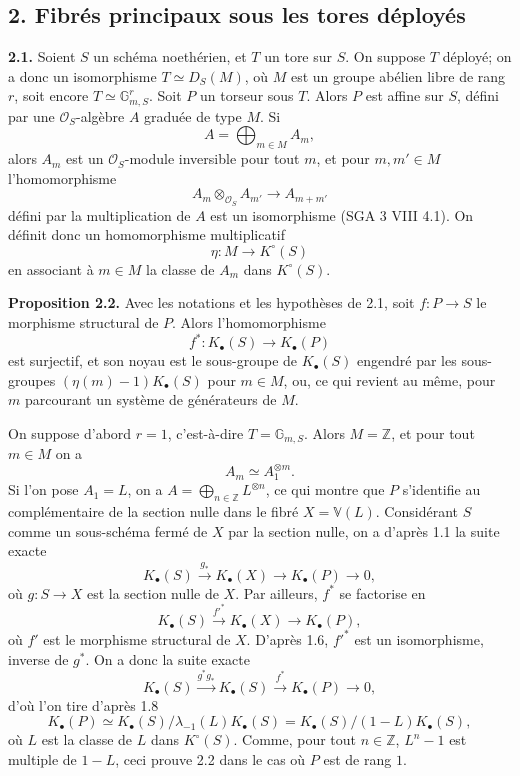 \documentclass[11pt]{article}
\begin{document}
\subsection*{2. Fibrés principaux sous les tores déployés}

\textbf{2.1.} Soient $S$ un schéma noethérien, et $T$ un tore sur $S$. On suppose $T$ déployé; on a donc un isomorphisme $T\simeq D_S(M)$, où $M$ est un groupe abélien libre de rang $r$, soit encore $T\simeq \mathbb G_{m,S}^r$. Soit $P$ un torseur sous $T$. Alors $P$ est affine sur $S$, défini par une $\mathcal O_S$-algèbre $A$ graduée de type $M$. Si
\[
A=\bigoplus_{m\in M}A_m,
\]
alors $A_m$ est un $\mathcal O_S$-module inversible pour tout $m$, et pour $m,m'\in M$ l'homomorphisme
\[
A_m\otimes_{\mathcal O_S}A_{m'}\longrightarrow A_{m+m'}
\]
défini par la multiplication de $A$ est un isomorphisme (SGA 3 VIII 4.1). On définit donc un homomorphisme multiplicatif
\[
\eta:M\longrightarrow K^\circ(S)
\]
en associant à $m\in M$ la classe de $A_m$ dans $K^\circ(S)$.

\textbf{Proposition 2.2.} Avec les notations et les hypothèses de 2.1, soit $f:P\to S$ le morphisme structural de $P$. Alors l'homomorphisme
\[
f^*:K_\bullet(S)\longrightarrow K_\bullet(P)
\]
est surjectif, et son noyau est le sous-groupe de $K_\bullet(S)$ engendré par les sous-groupes $(\eta(m)-1)K_\bullet(S)$ pour $m\in M$, ou, ce qui revient au même, pour $m$ parcourant un système de générateurs de $M$.

On suppose d'abord $r=1$, c'est-à-dire $T=\mathbb G_{m,S}$. Alors $M=\mathbb Z$, et pour tout $m\in M$ on a
\[
A_m\simeq A_1^{\otimes m}.
\]
Si l'on pose $A_1=L$, on a $A=\bigoplus_{n\in\mathbb Z}L^{\otimes n}$, ce qui montre que $P$ s'identifie au complémentaire de la section nulle dans le fibré $X=\mathbb V(L)$. Considérant $S$ comme un sous-schéma fermé de $X$ par la section nulle, on a d'après 1.1 la suite exacte
\[
K_\bullet(S)\xrightarrow{g_*}K_\bullet(X)\longrightarrow K_\bullet(P)\longrightarrow 0,
\]
où $g:S\to X$ est la section nulle de $X$. Par ailleurs, $f^*$ se factorise en
\[
K_\bullet(S)\xrightarrow{f'^*}K_\bullet(X)\longrightarrow K_\bullet(P),
\]
où $f'$ est le morphisme structural de $X$. D'après 1.6, $f'^*$ est un isomorphisme, inverse de $g^*$. On a donc la suite exacte
\[
K_\bullet(S)\xrightarrow{g^*g_*}K_\bullet(S)\xrightarrow{f^*}K_\bullet(P)\longrightarrow 0,
\]
d'où l'on tire d'après 1.8
\[
K_\bullet(P)\simeq K_\bullet(S)/\lambda_{-1}(L)K_\bullet(S)=K_\bullet(S)/(1-L)K_\bullet(S),
\]
où $L$ est la classe de $L$ dans $K^\circ(S)$. Comme, pour tout $n\in\mathbb Z$, $L^n-1$ est multiple de $1-L$, ceci prouve 2.2 dans le cas où $P$ est de rang $1$.
\end{document}
